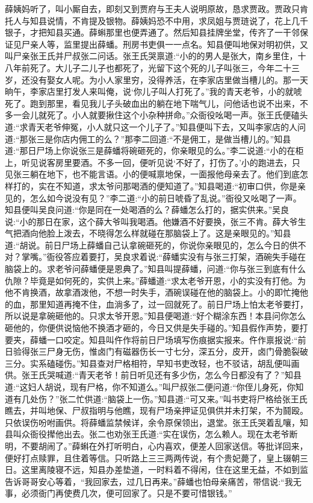 \begin{parag}
    薛姨妈听了，叫小厮自去，即刻又到贾府与王夫人说明原故，恳求贾政。贾政只肯托人与知县说情，不肯提及银物。薛姨妈恐不中用，求凤姐与贾琏说了，花上几千银子，才把知县买通。薛蝌那里也便弄通了。然后知县挂牌坐堂，传齐了一干邻保证见尸亲人等，监里提出薛蟠。刑房书吏俱一一点名。知县便叫地保对明初供，又叫尸亲张王氏并尸叔张二问话。张王氏哭禀道:“小的的男人是张大，南乡里住，十八年前死了。大儿子二儿子也都死了，光留下这个死的儿子叫张三，今年二十三岁，还没有娶女人呢。为小人家里穷，没得养活，在李家店里做当槽儿的。那一天晌午，李家店里打发人来叫俺，说‘你儿子叫人打死了。”我的青天老爷，小的就唬死了。跑到那里，看见我儿子头破血出的躺在地下喘气儿，问他话也说不出来，不多一会儿就死了。小人就要揪住这个小杂种拼命。”众衙役吆喝一声。张王氏便磕头道:“求青天老爷伸冤，小人就只这一个儿子了。”知县便叫下去，又叫李家店的人问道:“那张三是你店内佣工的么？”那李二回道:“不是佣工，是做当槽儿的。”知县道:“那日尸场上你说张三是薛蟠将碗砸死的，你亲眼见的么。”李二说道:“小的在柜上，听见说客房里要酒。不多一回，便听见说‘不好了，打伤了。’小的跑进去，只见张三躺在地下，也不能言语。小的便喊禀地保，一面报他母亲去了。他们到底怎样打的，实在不知道，求太爷问那喝酒的便知道了。”知县喝道:“初审口供，你是亲见的，怎么如今说没有见？”李二道:“小的前日唬昏了乱说。”衙役又吆喝了一声。知县便叫吴良问道:“你是同在一处喝酒的么？薛蟠怎么打的，据实供来。”吴良说:“小的那日在家，这个薛大爷叫我喝酒。他嫌酒不好要换，张三不肯。薛大爷生气把酒向他脸上泼去，不晓得怎么样就碰在那脑袋上了。这是亲眼见的。”知县道:“胡说。前日尸场上薛蟠自己认拿碗砸死的，你说你亲眼见的，怎么今日的供不对？掌嘴。”衙役答应着要打，吴良求着说:“薛蟠实没有与张三打架，酒碗失手碰在脑袋上的。求老爷问薛蟠便是恩典了。”知县叫提薛蟠，问道:“你与张三到底有什么仇隙？毕竟是如何死的，实供上来。”薛蟠道:“求太老爷开恩，小的实没有打他。为他不肯换酒，故拿酒泼他，不想一时失手，酒碗误碰在他的脑袋上。小的即忙掩他的血，那里知道再掩不住，血淌多了，过一回就死了。前日尸场上怕太老爷要打，所以说是拿碗砸他的。只求太爷开恩。”知县便喝道:“好个糊涂东西！本县问你怎么砸他的，你便供说恼他不换酒才砸的，今日又供是失手碰的。”知县假作声势，要打要夹，薛蟠一口咬定。知县叫仵作将前日尸场填写伤痕据实报来。仵作禀报说:“前日验得张三尸身无伤，惟卤门有磁器伤长一寸七分，深五分，皮开，卤门骨脆裂破三分。实系磕碰伤。”知县查对尸格相符，早知书吏改轻，也不驳诘，胡乱便叫画供。张王氏哭喊道:“青天老爷！前日听见还有多少伤，怎么今日都没有了？”知县道:“这妇人胡说，现有尸格，你不知道么。”叫尸叔张二便问道:“你侄儿身死，你知道有几处伤？”张二忙供道:“脑袋上一伤。”知县道:“可又来。”叫书吏将尸格给张王氏瞧去，并叫地保、尸叔指明与他瞧，现有尸场亲押证见俱供并未打架，不为鬪殴。只依误伤吩咐画供。将薛蟠监禁候详，余令原保领出，退堂。张王氏哭着乱嚷，知县叫众衙役撵他出去。张二也劝张王氏道:“实在误伤，怎么赖人。现在太老爷断明，不要胡闹了。”薛蝌在外打听明白，心内喜欢，便差人回家送信。等批详回来，便好打点赎罪，且住着等信。只听路上三三两两传说，有个贵妃薨了，皇上辍朝三日。这里离陵寝不远，知县办差垫道，一时料着不得闲，住在这里无益，不如到监告诉哥哥安心等着，“我回家去，过几日再来。”薛蟠也怕母亲痛苦，带信说:“我无事，必须衙门再使费几次，便可回家了。只是不要可惜银钱。”
\end{parag}


